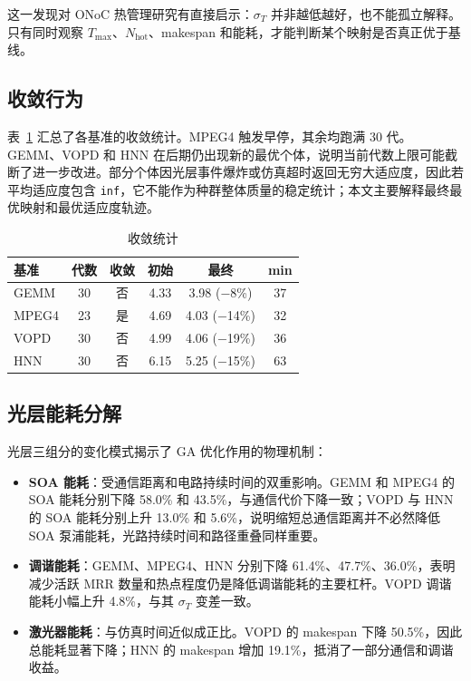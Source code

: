 \documentclass[conference]{IEEEtran}
\begin{document}
这一发现对 ONoC 热管理研究有直接启示：$\sigma_T$ 并非越低越好，也不能孤立解释。只有同时观察 $T_{\max}$、$N_{\text{hot}}$、makespan 和能耗，才能判断某个映射是否真正优于基线。

\subsection{收敛行为}

表~\ref{tab:convergence} 汇总了各基准的收敛统计。MPEG4 触发早停，其余均跑满 30 代。GEMM、VOPD 和 HNN 在后期仍出现新的最优个体，说明当前代数上限可能截断了进一步改进。部分个体因光层事件爆炸或仿真超时返回无穷大适应度，因此若平均适应度包含 \texttt{inf}，它不能作为种群整体质量的稳定统计；本文主要解释最终最优映射和最优适应度轨迹。

\begin{table}[h]
\centering
\caption{收敛统计}
\label{tab:convergence}
\footnotesize
\begin{tabular}{lccccc}
\toprule
\textbf{基准} & \textbf{代数} & \textbf{收敛} & \textbf{初始} & \textbf{最终} & \textbf{min} \\
\midrule
GEMM  & 30 & 否 & 4.33 & 3.98 ($-$8\%) & 37 \\
MPEG4 & 23 & 是 & 4.69 & 4.03 ($-$14\%) & 32 \\
VOPD  & 30 & 否 & 4.99 & 4.06 ($-$19\%) & 36 \\
HNN   & 30 & 否 & 6.15 & 5.25 ($-$15\%) & 63 \\
\bottomrule
\end{tabular}
\end{table}

\subsection{光层能耗分解}

光层三组分的变化模式揭示了 GA 优化作用的物理机制：

\begin{itemize}
\item \textbf{SOA 能耗}：受通信距离和电路持续时间的双重影响。GEMM 和 MPEG4 的 SOA 能耗分别下降 58.0\% 和 43.5\%，与通信代价下降一致；VOPD 与 HNN 的 SOA 能耗分别上升 13.0\% 和 5.6\%，说明缩短总通信距离并不必然降低 SOA 泵浦能耗，光路持续时间和路径重叠同样重要。
\item \textbf{调谐能耗}：GEMM、MPEG4、HNN 分别下降 61.4\%、47.7\%、36.0\%，表明减少活跃 MRR 数量和热点程度仍是降低调谐能耗的主要杠杆。VOPD 调谐能耗小幅上升 4.8\%，与其 $\sigma_T$ 变差一致。
\item \textbf{激光器能耗}：与仿真时间近似成正比。VOPD 的 makespan 下降 50.5\%，因此总能耗显著下降；HNN 的 makespan 增加 19.1\%，抵消了一部分通信和调谐收益。
\end{itemize}
\end{document}
